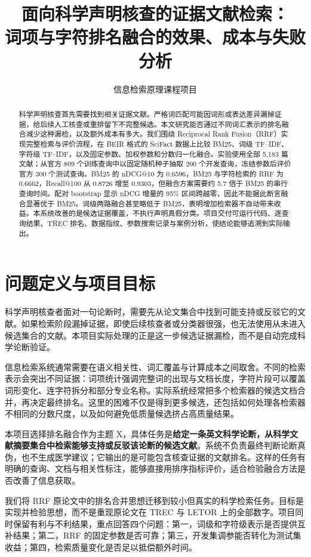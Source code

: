 \documentclass[sigconf,nonacm]{acmart}
\title{面向科学声明核查的证据文献检索：\texorpdfstring{\\}{ }词项与字符排名融合的效果、成本与失败分析}
\author{信息检索原理课程项目}
\affiliation{\institution{课程实验}\country{中国}}
\begin{document}
\begin{abstract}
科学声明核查首先需要找到相关证据文献。严格词匹配可能因词形或表达差异漏掉证据，给后续人工核查或重排留下不完整候选。本文研究能否通过不同词汇表示的排名融合减少这种漏检，以及额外成本有多大。我们围绕 Reciprocal Rank Fusion（RRF）实现完整检索与评价流程，在 BEIR 格式的 SciFact 数据上比较 BM25、词级 TF--IDF、字符级 TF--IDF，以及固定参数、加权参数和分数归一化融合。实验使用全部 5,183 篇文献；从官方 809 个训练查询中以固定随机种子抽取 200 个开发查询，冻结参数后评价官方 300 个测试查询。BM25 的 nDCG@10 为 0.6596，BM25 与字符检索的 RRF 为 0.6662，Recall@100 从 0.8726 增至 0.9303，但融合方案需要约 5.7 倍于 BM25 的串行查询时间。配对 bootstrap 显示 nDCG 增量的 95\% 区间跨越零，因此不能据此断言融合显著优于 BM25。词级两路融合甚至略低于 BM25，表明增加检索器不自动带来收益。本系统改善的是候选证据覆盖，不执行声明真假分类。项目交付可运行代码、逐查询结果、TREC 排名、数据指纹、参数搜索记录与案例分析，使结论能够追溯到实际输出。
\end{abstract}
\maketitle

\section{问题定义与项目目标}
科学声明核查者面对一句论断时，需要先从论文集合中找到可能支持或反驳它的文献。如果检索阶段漏掉证据，即使后续核查者或分类器很强，也无法使用从未进入候选集合的文献。本项目实际处理的正是这一步候选证据漏检，而不是自动完成科学论断验证。

信息检索系统通常需要在语义相关性、词汇覆盖与计算成本之间取舍。不同的检索表示会突出不同证据：词项统计强调完整词的出现与文档长度，字符片段可以覆盖词形变化、连字符拆分和部分专业名称。实际系统经常把多个检索器的候选文档合并，再决定最终排名。这里的困难不仅是得到更多候选，还包括如何处理各检索器不相同的分数尺度，以及如何避免低质量候选挤占高质量结果。

本项目选择排名融合作为主题 X，具体任务是\textbf{给定一条英文科学论断，从科学文献摘要集合中检索能够支持或反驳该论断的候选文献}。系统不负责最终判断论断真伪，也不生成医学建议；它输出的是可能包含核查证据的文献排名。这样的任务有明确的查询、文档与相关性标注，能够直接用排序指标评价，适合检验融合方法是否改善了信息获取。

我们将 RRF 原论文\cite{cormack2009rrf}中的排名合并思想迁移到较小但真实的科学检索任务。目标是实现并检验思想，而不是重现原论文在 TREC 与 LETOR 上的全部数字。项目同时保留有利与不利结果，重点回答四个问题：第一，词级和字符级表示是否提供互补结果；第二，RRF 的固定参数是否可靠；第三，开发集调参能否转化为测试集收益；第四，检索质量变化是否足以抵偿额外时间。
\end{document}
